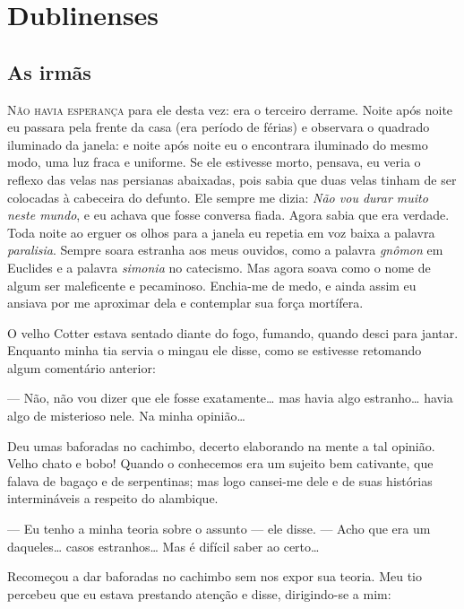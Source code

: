 \part{Dublinenses}


\chapter{As irmãs}


\textsc{Não havia esperança} para ele desta vez: era o terceiro derrame.  Noite
após noite eu passara pela frente da casa (era período de férias) e observara o
quadrado iluminado da janela: e noite após noite eu o encontrara iluminado do
mesmo modo, uma luz fraca e uniforme.  Se ele estivesse morto, pensava, eu
veria o reflexo das velas nas persianas abaixadas, pois sabia que duas velas
tinham de ser colocadas à cabeceira do defunto.  Ele sempre me dizia:
\textit{Não vou durar muito neste mundo}, e eu achava que fosse conversa fiada.
Agora sabia que era verdade.  Toda noite ao erguer os olhos para a janela eu
repetia em voz baixa a palavra \textit{paralisia}.  Sempre soara estranha aos
meus ouvidos, como a palavra \textit{gnômon} em Euclides e a palavra
\textit{simonia} no catecismo.  Mas agora soava como o nome de algum ser
maleficente e pecaminoso.  Enchia-me de medo, e ainda assim eu ansiava por me
aproximar dela e contemplar sua força mortífera.

O velho Cotter estava sentado diante do fogo, fumando, quando desci para
jantar.  Enquanto minha tia servia o mingau ele disse, como se estivesse
retomando algum comentário anterior:

--- Não, não vou dizer que ele fosse exatamente\ldots{} mas havia algo
estranho\ldots{} havia algo de misterioso nele.  Na minha opinião\ldots{}

Deu umas baforadas no cachimbo, decerto elaborando na mente a tal opinião.
Velho chato e bobo! Quando o conhecemos era um sujeito bem cativante, que
falava de bagaço e de serpentinas; mas logo cansei-me dele e de suas histórias
intermináveis a respeito do alambique.

--- Eu tenho a minha teoria sobre o assunto --- ele disse.  --- Acho que era um
daqueles\ldots{} casos estranhos\ldots{} Mas é difícil saber ao certo\ldots{}

Recomeçou a dar baforadas no cachimbo sem nos expor sua teoria.  Meu tio
percebeu que eu estava prestando atenção e disse, dirigindo-se a mim:

